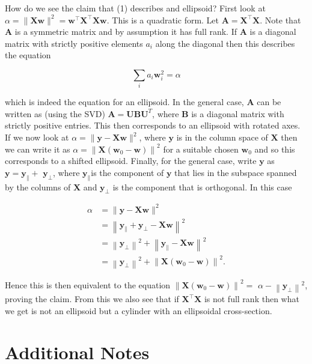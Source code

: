 \documentclass[10pt]{article}
\begin{document}
How do we see the claim that (1) describes and ellipsoid? First look at $\alpha=\|\mathbf{X w}\|^{2}=\mathbf{w}^{\top} \mathbf{X}^{\top} \mathbf{X w}$. This is a quadratic form. Let $\mathbf{A}=\mathbf{X}^{\top} \mathbf{X}$. Note that $\mathbf{A}$ is a symmetric matrix and by assumption it has full rank. If $\mathbf{A}$ is a diagonal matrix with strictly positive elements $a_{i}$ along the diagonal then this describes the equation

$$
\sum_{i} a_{i} \mathbf{w}_{i}^{2}=\alpha
$$

which is indeed the equation for an ellipsoid. In the general case, $\mathbf{A}$ can be written as (using the SVD) $\mathbf{A}=\mathbf{U B U}^{T}$, where $\mathbf{B}$ is a diagonal matrix with strictly positive entries. This then corresponds to an ellipsoid with rotated axes. If we now look at $\alpha=\|\mathbf{y}-\mathbf{X} \mathbf{w}\|^{2}$, where $\mathbf{y}$ is in the column space of $\mathbf{X}$ then we can write it as $\alpha=\left\|\mathbf{X}\left(\mathbf{w}_{0}-\mathbf{w}\right)\right\|^{2}$ for a suitable chosen $\mathbf{w}_{0}$ and so this corresponds to a shifted ellipsoid. Finally, for the general case, write $\mathbf{y}$ as $\mathbf{y}=\mathbf{y}_{\|}+$ $\mathbf{y}_{\perp}$, where $\mathbf{y}_{\|}$is the component of $\mathbf{y}$ that lies in the subspace spanned by the columns of $\mathbf{X}$ and $\mathbf{y}_{\perp}$ is the component that
is orthogonal. In this case

$$
\begin{aligned}
\alpha & =\|\mathbf{y}-\mathbf{X} \mathbf{w}\|^{2} \\
& =\left\|\mathbf{y}_{\|}+\mathbf{y}_{\perp}-\mathbf{X} \mathbf{w}\right\|^{2} \\
& =\left\|\mathbf{y}_{\perp}\right\|^{2}+\left\|\mathbf{y}_{\|}-\mathbf{X} \mathbf{w}\right\|^{2} \\
& =\left\|\mathbf{y}_{\perp}\right\|^{2}+\left\|\mathbf{X}\left(\mathbf{w}_{0}-\mathbf{w}\right)\right\|^{2} .
\end{aligned}
$$

Hence this is then equivalent to the equation $\left\|\mathbf{X}\left(\mathbf{w}_{0}-\mathbf{w}\right)\right\|^{2}=$ $\alpha-\left\|\mathbf{y}_{\perp}\right\|^{2}$, proving the claim. From this we also see that if $\mathbf{X}^{\top} \mathbf{X}$ is not full rank then what we get is not an ellipsoid but a cylinder with an ellipsoidal cross-section.

\section*{Additional Notes}
\end{document}
